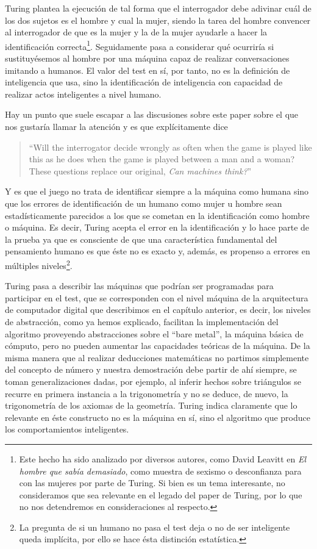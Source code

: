\documentclass[12pt]{memoir}
\begin{document}
Turing plantea la ejecución de tal forma que el interrogador debe adivinar cuál de los dos sujetos es el hombre y cual la mujer, siendo la tarea del hombre convencer al interrogador de que es la mujer y la de la mujer ayudarle a hacer la identificación correcta\footnote{Este hecho ha sido analizado por diversos autores, como David Leavitt en \textit{El hombre que sabía demasiado}, como muestra de sexismo o desconfianza para con las mujeres por parte de Turing. Si bien es un tema interesante, no consideramos que sea relevante en el legado del paper de Turing, por lo que no nos detendremos en consideraciones al respecto.}. Seguidamente pasa a considerar qué ocurriría si sustituyésemos al hombre por una máquina capaz de realizar conversaciones imitando a humanos. El valor del test en sí, por tanto, no es la definición de inteligencia que usa, sino la identificación de inteligencia con capacidad de realizar actos inteligentes a nivel humano. 

Hay un punto que suele escapar a las discusiones sobre este paper sobre el que nos gustaría llamar la atención y es que \parencite{Turing1950cmi} explícitamente dice 
\begin{quotation}
``Will the interrogator decide wrongly as often when the game is played like this as he does when the game is played between a man and a woman? These questions replace our original, \textit{Can machines think?}''
\end{quotation} 

Y es que el juego no trata de identificar siempre a la máquina como humana sino que los errores de identificación de un humano como mujer u hombre sean estadísticamente parecidos a los que se cometan en la identificación como hombre o máquina. Es decir, Turing acepta el error en la identificación y lo hace parte de la prueba ya que es consciente de que una característica fundamental del pensamiento humano es que éste no es exacto y, además, es propenso a errores en múltiples niveles\footnote{La pregunta de si un humano no pasa el test deja o no de ser inteligente queda implícita, por ello se hace ésta distinción estatística.}. 

Turing pasa a describir las máquinas que podrían ser programadas para participar en el test, que se corresponden con el nivel máquina de la arquitectura de computador digital que describimos en el capítulo anterior, es decir, los niveles de abstracción, como ya hemos explicado, facilitan la implementación del algoritmo proveyendo abstracciones sobre el ``bare metal'', la máquina básica de cómputo, pero no pueden aumentar las capacidades teóricas de la máquina. De la misma manera que al realizar deducciones matemáticas no partimos simplemente del concepto de número y nuestra demostración debe partir de ahí siempre, se toman generalizaciones dadas, por ejemplo, al inferir hechos sobre triángulos se recurre en primera instancia a la trigonometría y no se deduce, de nuevo, la trigonometría de los axiomas de la geometría. Turing indica claramente que lo relevante en éste constructo no es la máquina en sí, sino el algoritmo que produce los comportamientos inteligentes.
\end{document}
